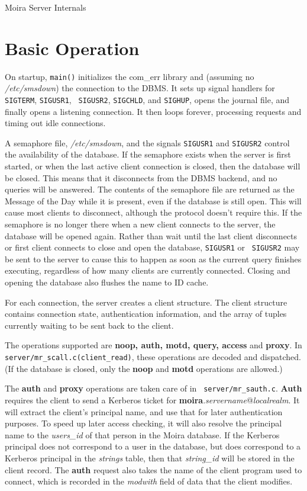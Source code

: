 

\begin{center}
{\Large Moira Server Internals}
\end{center}

\section{Basic Operation}

On startup, {\tt main()} initializes the com\_err library and
(assuming no {\it /etc/smsdown\/}) the connection to the DBMS. It
sets up signal handlers for {\tt SIGTERM}, {\tt SIGUSR1}, {\tt
SIGUSR2}, {\tt SIGCHLD}, and {\tt SIGHUP}, opens the journal file, and
finally opens a listening connection. It then loops forever,
processing requests and timing out idle connections.

A semaphore file, {\it /etc/smsdown}, and the signals {\tt SIGUSR1}
and {\tt SIGUSR2} control the availability of the database. If the
semaphore exists when the server is first started, or when the last
active client connection is closed, then the database will be closed.
This means that it disconnects from the DBMS backend, and no queries
will be answered. The contents of the semaphore file are returned as
the Message of the Day while it is present, even if the database is
still open. This will cause most clients to disconnect, although the
protocol doesn't require this. If the semaphore is no longer there
when a new client connects to the server, the database will be opened
again. Rather than wait until the last client disconnects or first
client connects to close and open the database, {\tt SIGUSR1} or {\tt
SIGUSR2} may be sent to the server to cause this to happen as soon as
the current query finishes executing, regardless of how many clients
are currently connected. Closing and opening the database also flushes
the name to ID cache.

For each connection, the server creates a client structure. The client
structure contains connection state, authentication information, and
the array of tuples currently waiting to be sent back to the client.

The operations supported are {\bf noop, auth, motd, query, access} and
{\bf proxy}. In {\tt server/mr\_scall.c(client\_read)}, these
operations are decoded and dispatched. (If the database is closed,
only the {\bf noop} and {\bf motd} operations are allowed.)

The {\bf auth} and {\bf proxy} operations are taken care of in {\tt
server/mr\_sauth.c}. {\bf Auth} requires the client to send a Kerberos
ticket for {\bf moira}.{\it servername\/}@{\it localrealm}. It will
extract the client's principal name, and use that for later
authentication purposes. To speed up later access checking, it will
also resolve the principal name to the {\it users\_id} of that person
in the Moira database. If the Kerberos principal does not correspond
to a user in the database, but does correspond to a Kerberos principal
in the {\it strings\/} table, then that {\it string\_id\/} will be
stored in the client record. The {\bf auth} request also takes the
name of the client program used to connect, which is recorded in the
{\it modwith\/} field of data that the client modifies.

